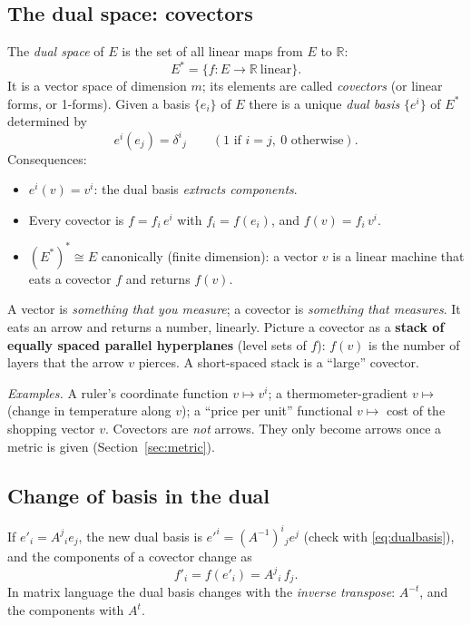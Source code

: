 \documentclass[11pt,a4paper]{article}
\numberwithin{equation}{section}
\theoremstyle{definition}
\theoremstyle{plain}
\newcommand{\R}{\mathbb{R}}
\begin{document}


\subsection{The dual space: covectors}\label{sec:dualspace}

\begin{formal}
The \emph{dual space} of $E$ is the set of all linear maps from $E$ to $\R$:
\[
E^*=\{f:E\to\R\ \text{linear}\}.
\]
It is a vector space of dimension $m$; its elements are called \emph{covectors} (or linear forms, or 1-forms). Given a basis $\{e_i\}$ of $E$ there is a unique \emph{dual basis} $\{e^{i}\}$ of $E^*$ determined by
\begin{equation}\label{eq:dualbasis}
e^{i}(e_j)=\delta^i{}_j\qquad(\text{1 if }i=j,\ 0\text{ otherwise}).
\end{equation}
Consequences:
\begin{itemize}[nosep]
\item $e^{i}(v)=v^i$: the dual basis \emph{extracts components}.
\item Every covector is $f=f_i\,e^{i}$ with $f_i=f(e_i)$, and $f(v)=f_i\,v^i$.
\item $(E^*)^*\cong E$ canonically (finite dimension): a vector $v$ is a linear machine that eats a covector $f$ and returns $f(v)$.
\end{itemize}
\end{formal}

\begin{intuition}
A vector is \emph{something that you measure}; a covector is \emph{something that measures}. It eats an arrow and returns a number, linearly. Picture a covector as a \textbf{stack of equally spaced parallel hyperplanes} (level sets of $f$): $f(v)$ is the number of layers that the arrow $v$ pierces. A short-spaced stack is a ``large'' covector.

\emph{Examples.} A ruler's coordinate function $v\mapsto v^i$; a thermometer-gradient $v\mapsto$ (change in temperature along $v$); a ``price per unit'' functional $v\mapsto$ cost of the shopping vector $v$. Covectors are \emph{not} arrows. They only become arrows once a metric is given (Section~\ref{sec:metric}).
\end{intuition}

\subsection*{Change of basis in the dual}
If $e'_i=A^j{}_ie_j$, the new dual basis is $e'^{i}=(A^{-1})^i{}_je^{j}$ (check with \eqref{eq:dualbasis}), and the components of a covector change as
\begin{equation}\label{eq:covchange}
f'_i=f(e'_i)=A^j{}_i\,f_j .
\end{equation}
In matrix language the dual basis changes with the \emph{inverse transpose}: $A^{-t}$, and the components with $A^{t}$.
\end{document}
